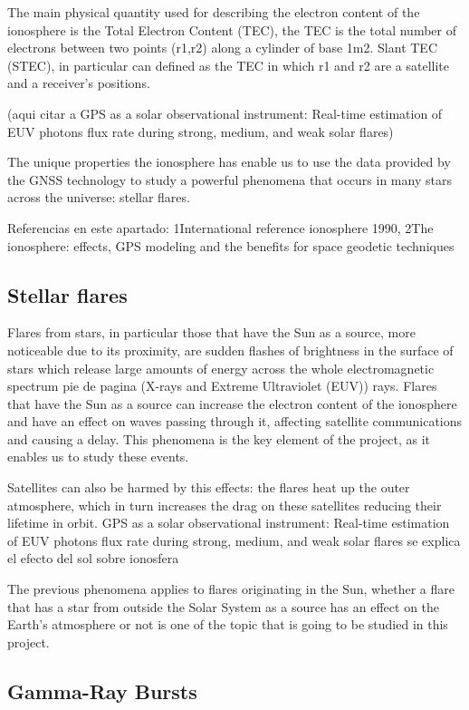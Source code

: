 The main physical quantity used for describing the electron content of the ionosphere is the Total Electron Content (TEC), the TEC is the total number of electrons between two points (r1,r2) along a cylinder of base 1m2. 
Slant TEC (STEC), in particular can defined as the TEC in which r1 and r2 are a satellite and a receiver’s positions.

 (aqui citar a GPS as a solar observational instrument: Real-time estimation of EUV photons flux rate during strong, medium, and weak solar flares)

The unique properties the ionosphere has enable us to use the data provided by the GNSS technology to study a powerful phenomena that occurs in many stars across the universe: stellar flares.

Referencias en este apartado: 1{International reference ionosphere 1990}, 2{The ionosphere: effects, GPS modeling and the benefits for space geodetic techniques}

\subsection{Stellar flares}

Flares from stars, in particular those that have the Sun as a source, more noticeable due to its proximity, are sudden flashes of brightness in the surface of stars which release large amounts of energy across the whole electromagnetic spectrum pie de pagina  (X-rays and Extreme Ultraviolet (EUV)) rays.
Flares that have the Sun as a source can increase the electron content of the ionosphere and have an effect on waves passing through it, affecting satellite communications and causing a delay. This phenomena is the key element of the project, as it enables us to study these events.

Satellites can also be harmed by this effects: the flares heat up the outer atmosphere, which in turn increases the drag on these satellites reducing their lifetime in orbit.
{GPS as a solar observational instrument: Real-time estimation of EUV photons flux rate during strong, medium, and weak solar flares se explica el efecto del sol sobre ionosfera}

The previous phenomena applies to flares originating in the Sun, whether a flare that has a star from outside the Solar System as a source has an effect on the Earth’s atmosphere or not is one of the topic that is going to be studied in this project.

\subsection{Gamma-Ray Bursts}

